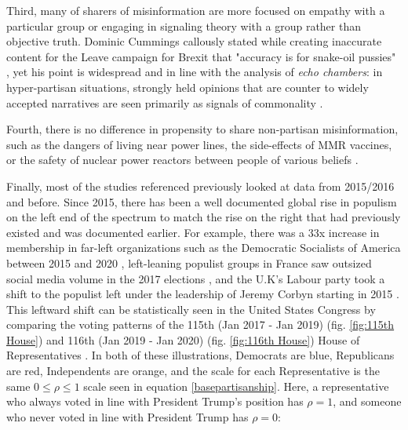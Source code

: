 \documentclass[NETN,manuscript]{stjour-new}
\begin{document}
Third, many of sharers of misinformation are more focused on empathy with a particular group \citep{winter2015they,rheault2016measuring,dale2017nlp} or engaging in signaling theory with a group \citep{connelly2011signaling,lampe2007familiar,spence2002signaling} rather than objective truth. Dominic Cummings callously stated while creating inaccurate content for the Leave campaign for Brexit that "accuracy is for snake-oil pussies" \citep{crace2016accuracy}, yet his point is widespread and in line with the analysis of \textit{echo chambers}: in hyper-partisan situations, strongly held opinions that are counter to widely accepted narratives are seen primarily as signals of commonality \citep{yla2018populist,noppari2019user,lazer2018science,yla2019politicization,wasilewski2019us,freelon2020russian}. 


Fourth, there is no difference in propensity to share non-partisan misinformation, such as the dangers of living near power lines, the side-effects of MMR vaccines, or the safety of nuclear power reactors between people of various beliefs \citep{kahan2015climate,hara2016co,kahan2012ideology,lewandowsky2016motivated,barbera2015tweeting}.

Finally, most of the studies referenced previously looked at data from 2015/2016 and before. Since 2015, there has been a well documented global rise in populism on the left end of the spectrum to match the rise on the right that had previously existed and was documented earlier. For example, there was a 33x increase in membership in far-left organizations such as the Democratic Socialists of America between 2015 and 2020 \citep{godfrey2020thousands}, left-leaning populist groups in France saw outsized social media volume in the 2017 elections \citep{donadio2017french}, and the U.K's Labour party took a shift to the populist left under the leadership of Jeremy Corbyn starting in 2015 \citep{wainwright2018remarkable,hobson_fielding_2019}. This leftward shift can be statistically seen in the United States Congress by comparing the voting patterns of the 115th (Jan 2017 - Jan 2019) (fig. \ref{fig:115th House}) and 116th (Jan 2019 - Jan 2020) (fig. \ref{fig:116th House}) House of Representatives \citep{fivethirtyeight2018tracking}. In both of these illustrations, Democrats are blue, Republicans are red, Independents are orange, and the scale for each Representative is the same $0\leq \rho \leq 1$ scale seen in equation \ref{basepartisanship}. Here, a representative who always voted in line with President Trump's position has $\rho = 1$, and someone who never voted in line with President Trump has $\rho = 0$:
\end{document}
